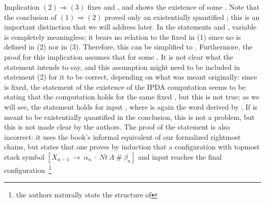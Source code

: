 \begin{isabellebody}
\begin{isamarkuptext}
Implication $(2) \Longrightarrow (3)$ fixes  and , and shows the existence of some \isa{{\isasymrho}}. Note
that the conclusion of $(1) \Longrightarrow (2)$ proved only an existentially quantified ; this is an 
important distinction that we will address later.
In the statements \isa{\isafree{{\isasymgamma}}\ {\isacharequal}{\kern0pt}\ \isafree{{\isasymgamma}{\isacharprime}{\kern0pt}}\ {\isacharat}{\kern0pt}\ \isafree{{\isasymalpha}}} and , variable \isa{{\isasymgamma}} is completely
meaningless; it bears no relation to the \isa{{\isasymgamma}} fixed in (1) since no \isa{{\isasymgamma}} is defined in (2) nor in (3). 
Therefore, this can be simplified to 
. Furthermore, the proof for this implication assumes that 
for some . It is not clear what the statement intends to say, and this assumption
might need to be included in statement (2) for it to be correct, depending on what was meant 
originally: since  is fixed, the statement of the existence of the IPDA computation seems to 
be stating that the computation holds for the same fixed , but this is not true; as we will see, 
the statement holds for input , where  is again the word derived by \isa{{\isasymbeta}}. If  is 
meant to be existentially quantified in the conclusion, this is not a problem, but this is not made
clear by the authors. The proof of the statement is also incorrect: it uses the book's informal
equivalent of our formalized rightmost chains, but states that one proves by induction that a 
configuration with topmost stack symbol $[X_{n-1}\ \to\ \alpha_n\ \cdot\ Nt\ A\ \#\ \beta_n]$
and input  reaches the final configuration~\footnote{the authors naturally state the structure of
}
\end{isamarkuptext}
\end{isabellebody}
